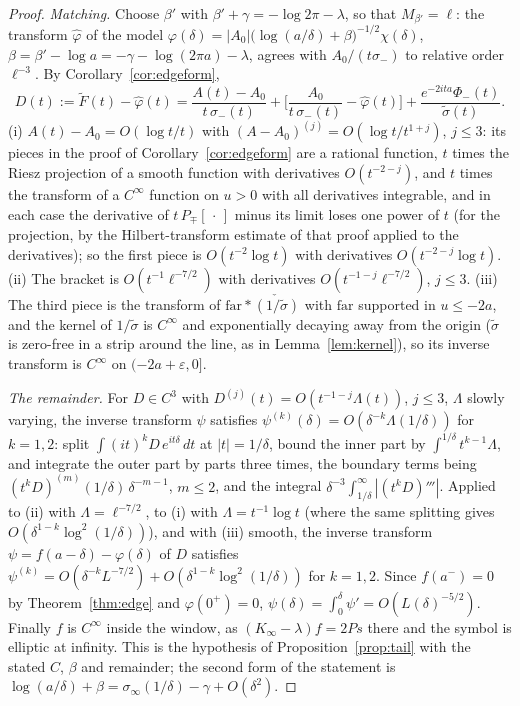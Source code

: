 \documentclass[11pt]{article}
\theoremstyle{definition}
\theoremstyle{remark}
\begin{document}
\begin{proof}
\emph{Matching.} Choose $\beta'$ with $\beta'+\gamma=-\log2\pi-\lambda$, so that $M_{\beta'}=\ell$: the transform $\hat\varphi$ of the model $\varphi(\delta)=|A_0|\big(\log(a/\delta)+\beta\big)^{-1/2}\chi(\delta)$, $\beta=\beta'-\log a=-\gamma-\log(2\pi a)-\lambda$, agrees with $A_0/(t\sigma_-)$ to relative order $\ell^{-3}$. By Corollary~\ref{cor:edgeform},
\[
D(t):=\tilde F(t)-\hat\varphi(t)=\frac{A(t)-A_0}{t\,\sigma_-(t)}+\Big[\frac{A_0}{t\,\sigma_-(t)}-\hat\varphi(t)\Big]+\frac{e^{-2ita}\Phi_-(t)}{\tilde\sigma(t)} .
\]
(i) $A(t)-A_0=O(\log t/t)$ with $(A-A_0)^{(j)}=O(\log t/t^{1+j})$, $j\le3$: its pieces in the proof of Corollary~\ref{cor:edgeform} are a rational function, $t$ times the Riesz projection of a smooth function with derivatives $O(t^{-2-j})$, and $t$ times the transform of a $C^\infty$ function on $u>0$ with all derivatives integrable, and in each case the derivative of $t\,P_\mp[\,\cdot\,]$ minus its limit loses one power of $t$ (for the projection, by the Hilbert-transform estimate of that proof applied to the derivatives); so the first piece is $O(t^{-2}\log t)$ with derivatives $O(t^{-2-j}\log t)$. (ii) The bracket is $O(t^{-1}\ell^{-7/2})$ with derivatives $O(t^{-1-j}\ell^{-7/2})$, $j\le3$. (iii) The third piece is the transform of $\mathrm{far}*\check{(1/\tilde\sigma)}$ with $\mathrm{far}$ supported in $u\le-2a$, and the kernel of $1/\tilde\sigma$ is $C^\infty$ and exponentially decaying away from the origin ($\tilde\sigma$ is zero-free in a strip around the line, as in Lemma~\ref{lem:kernel}), so its inverse transform is $C^\infty$ on $(-2a+\varepsilon,0]$.

\emph{The remainder.} For $D\in C^3$ with $D^{(j)}(t)=O(t^{-1-j}\Lambda(t))$, $j\le3$, $\Lambda$ slowly varying, the inverse transform $\psi$ satisfies $\psi^{(k)}(\delta)=O(\delta^{-k}\Lambda(1/\delta))$ for $k=1,2$: split $\int(it)^kD\,e^{it\delta}\,dt$ at $|t|=1/\delta$, bound the inner part by $\int^{1/\delta}t^{k-1}\Lambda$, and integrate the outer part by parts three times, the boundary terms being $(t^kD)^{(m)}(1/\delta)\,\delta^{-m-1}$, $m\le2$, and the integral $\delta^{-3}\int_{1/\delta}^\infty|(t^kD)'''|$. Applied to (ii) with $\Lambda=\ell^{-7/2}$, to (i) with $\Lambda=t^{-1}\log t$ (where the same splitting gives $O(\delta^{1-k}\log^2(1/\delta))$), and with (iii) smooth, the inverse transform $\psi=f(a-\delta)-\varphi(\delta)$ of $D$ satisfies $\psi^{(k)}=O(\delta^{-k}L^{-7/2})+O(\delta^{1-k}\log^2(1/\delta))$ for $k=1,2$. Since $f(a^-)=0$ by Theorem~\ref{thm:edge} and $\varphi(0^+)=0$, $\psi(\delta)=\int_0^\delta\psi'=O(L(\delta)^{-5/2})$. Finally $f$ is $C^\infty$ inside the window, as $(K_\infty-\lambda)f=2Ps$ there and the symbol is elliptic at infinity. This is the hypothesis of Proposition~\ref{prop:tail} with the stated $C$, $\beta$ and remainder; the second form of the statement is $\log(a/\delta)+\beta=\sigma_\infty(1/\delta)-\gamma+O(\delta^2)$.
\end{proof}
\end{document}
